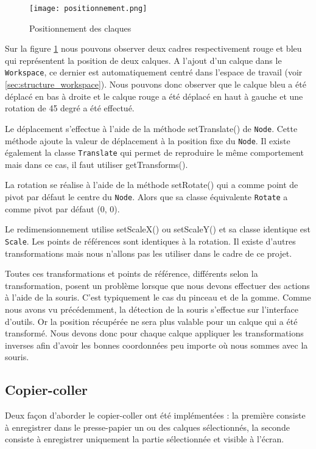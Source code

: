 \begin{figure}[!ht]
    \caption{Positionnement des claques}
    \centering
    \texttt{[image: positionnement.png]}
    \label{fig:calque_positionnement}
\end{figure}

Sur la figure \ref{fig:calque_positionnement} nous pouvons observer deux cadres respectivement rouge et bleu qui représentent la position de deux calques. A l'ajout d'un calque dans le \texttt{Workspace}, ce dernier est automatiquement centré dans l'espace de travail (voir \ref{sec:structure_workspace}). Nous pouvons donc observer que le calque bleu a été déplacé en bas à droite et le calque rouge a été déplacé en haut à gauche et une rotation de 45 degré a été effectué.

Le déplacement s'effectue à l'aide de la méthode setTranslate() de \texttt{Node}. Cette méthode ajoute la valeur de déplacement à la position fixe du \texttt{Node}. Il existe également la classe \texttt{Translate} qui permet de reproduire le même comportement mais dans ce cas, il faut utiliser getTransforms().

La rotation se réalise à l'aide de la méthode setRotate() qui a comme point de pivot par défaut le centre du \texttt{Node}. Alors que sa classe équivalente \texttt{Rotate} a comme pivot par défaut (0, 0).

Le redimensionnement utilise setScaleX() ou setScaleY() et sa classe identique est \texttt{Scale}. Les points de références sont identiques à la rotation. Il existe d'autres transformations mais nous n'allons pas les utiliser dans le cadre de ce projet.

Toutes ces transformations et points de référence, différents selon la transformation, posent un problème lorsque que nous devons effectuer des actions à l'aide de la souris. C'est typiquement le cas du pinceau et de la gomme. Comme nous avons vu précédemment, la détection de la souris s'effectue sur l'interface d'outils. Or la position récupérée ne sera plus valable pour un calque qui a été transformé. Nous devons donc pour chaque calque appliquer les transformations inverses afin d'avoir les bonnes coordonnées peu importe où nous sommes avec la souris.

\subsection{Copier-coller}
\label{sec:copiercoller}
Deux façon d'aborder le copier-coller ont été implémentées : la première consiste à enregistrer dans le presse-papier un ou des calques sélectionnés, la seconde consiste à enregistrer uniquement la partie sélectionnée et visible à l'écran.

